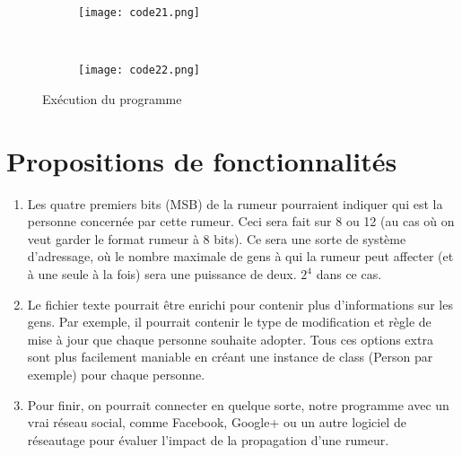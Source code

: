 \documentclass[11pt,a4paper]{article}
\begin{document}
\begin{figure}[!ht]
        \centering
        \begin{subfigure}[b]{0.5\textwidth}
                \texttt{[image: code21.png]}
        \end{subfigure}%
        ~ %
        \begin{subfigure}[b]{0.37\textwidth}
                \texttt{[image: code22.png]}
        \end{subfigure}
        \caption{Exécution du programme}\label{fig:code2}
\end{figure}

\clearpage

\section{Propositions de fonctionnalités}

\begin{enumerate}
\item Les quatre premiers bits (MSB) de la rumeur pourraient indiquer qui est la personne concernée par cette rumeur. Ceci sera fait sur 8 ou 12 (au cas où on veut garder le format rumeur à 8 bits). Ce sera une sorte de système d'adressage, où le nombre maximale de gens à qui la rumeur peut affecter (et à une seule à la fois) sera une puissance de deux. $ 2^4 $ dans ce cas.

\item Le fichier texte pourrait être enrichi pour contenir plus d'informations sur les gens. Par exemple, il pourrait contenir le type de modification et règle de mise à jour que chaque personne souhaite adopter. Tous ces options extra sont plus facilement maniable en créant une instance de class (Person par exemple) pour chaque personne.

\item Pour finir, on pourrait connecter en quelque sorte, notre programme avec un vrai réseau social, comme Facebook, Google+ ou un autre logiciel de réseautage  pour évaluer l'impact de la propagation d'une rumeur.

\end{enumerate}
\end{document}
